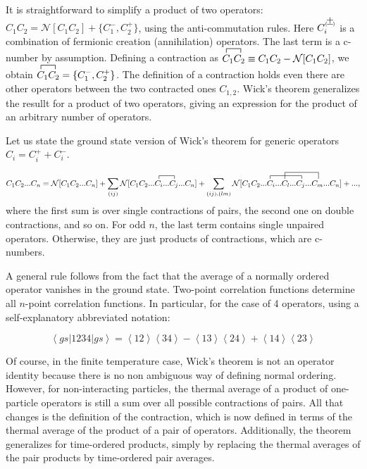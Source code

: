 It is straightforward to simplify a product of two operators: $C_1 C_2 = \mathcal{N} [ C_1 C_2 ] + \{ C_1^- , C_2^+ \} $, using the anti-commutation rules.
Here $C_i^{\Pm}$ is a combination of fermionic creation (annihilation) operators. 
The last term is a c-number by assumption.
Defining a contraction as $\contraction{}{C}{ {}_1 }{C_2}
C_1 C_2 \equiv C_1 C_2 - \mathcal{N}[ C_1 C_2 ]$, we obtain $\contraction{}{C}{ {}_1 }{C_2}
C_1 C_2 =  \{ C_1^- , C_2^+ \}  $.
The definition of a contraction holds even there are other operators between the two contracted ones $C_{1, 2}$.
Wick's theorem generalizes the resullt for a product of two operators, giving an expression for the product of an arbitrary number of operators.

Let us state the ground state version of Wick's theorem for generic operators $C_i= C_i^+ + C_i^-$.

\begin{equation}
C_1 C_2 ... C_n = \mathcal{N} [ C_1 C_2 ... C_n ] + \sum_{(ij)} \mathcal{N} [ C_1 C_2 ...
\contraction{}{C_i}{...}{C_j}
C_i ... C_j ... C_n ]
+ \sum_{(ij), (lm)} \mathcal{N} [ C_1 C_2 ...
\contraction{}{C}{ {}_i ... C_l ... }{C_j}
C_i ... 
\contraction[2ex]{}{C}{ {}_l ... C_j ... }{C_m}C_l ... C_j ... C_m ... C_n ] + ... ,
\end{equation}
where the first sum is over single contractions of pairs, the second one on double contractions, and so on.
For odd $n$, the last term contains single unpaired operators.
Otherwise, they are just products of contractions, which are c-numbers.

A general rule follows from the fact that the average of a normally ordered operator vanishes in the ground state.
Two-point correlation functions determine all $n$-point correlation functions.
In particular, for the case of 4 operators, using a self-explanatory abbreviated notation:

\begin{equation}
\left\langle gs | 1234 | gs \right\rangle = \left\langle 12 \right\rangle \left\langle 34 \right\rangle - \left\langle 13 \right\rangle \left\langle 24 \right\rangle + \left\langle 14 \right\rangle \left\langle 23 \right\rangle
\end{equation}

Of course, in the finite temperature case, Wick's theorem is not an operator identity because there is no non ambiguous way of defining normal ordering.
However, for non-interacting particles, the thermal average of a product of one-particle operators is still a sum over all possible contractions of pairs.
All that changes is the definition of the contraction, which is now defined in terms of the thermal average of the product of a pair of operators.
Additionally, the theorem generalizes for time-ordered products, simply by replacing the thermal averages of the pair products by time-ordered pair averages.

